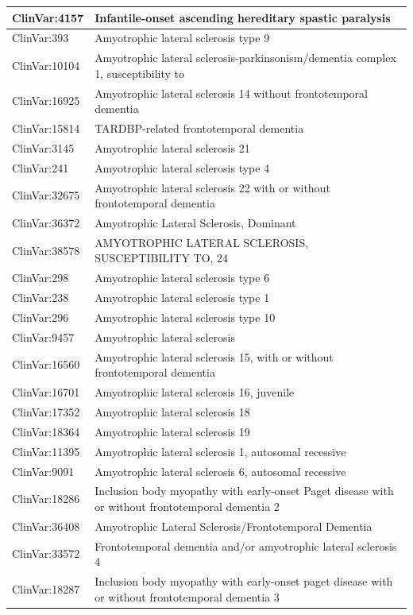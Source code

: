 \documentclass[9pt,a4paper,]{extarticle}
\begin{document}
\begin{table}
\begin{tabular}[t]{l|l}
\hline
ClinVar:4157 & Infantile-onset ascending hereditary spastic paralysis\\
\hline
ClinVar:393 & Amyotrophic lateral sclerosis type 9\\
\hline
ClinVar:10104 & Amyotrophic lateral sclerosis-parkinsonism/dementia complex 1, susceptibility to\\
\hline
ClinVar:16925 & Amyotrophic lateral sclerosis 14 without frontotemporal dementia\\
\hline
ClinVar:15814 & TARDBP-related frontotemporal dementia\\
\hline
ClinVar:3145 & Amyotrophic lateral sclerosis 21\\
\hline
ClinVar:241 & Amyotrophic lateral sclerosis type 4\\
\hline
ClinVar:32675 & Amyotrophic lateral sclerosis 22 with or without frontotemporal dementia\\
\hline
ClinVar:36372 & Amyotrophic Lateral Sclerosis, Dominant\\
\hline
ClinVar:38578 & AMYOTROPHIC LATERAL SCLEROSIS, SUSCEPTIBILITY TO, 24\\
\hline
ClinVar:298 & Amyotrophic lateral sclerosis type 6\\
\hline
ClinVar:238 & Amyotrophic lateral sclerosis type 1\\
\hline
ClinVar:296 & Amyotrophic lateral sclerosis type 10\\
\hline
ClinVar:9457 & Amyotrophic lateral sclerosis\\
\hline
ClinVar:16560 & Amyotrophic lateral sclerosis 15, with or without frontotemporal dementia\\
\hline
ClinVar:16701 & Amyotrophic lateral sclerosis 16, juvenile\\
\hline
ClinVar:17352 & Amyotrophic lateral sclerosis 18\\
\hline
ClinVar:18364 & Amyotrophic lateral sclerosis 19\\
\hline
ClinVar:11395 & Amyotrophic lateral sclerosis 1, autosomal recessive\\
\hline
ClinVar:9091 & Amyotrophic lateral sclerosis 6, autosomal recessive\\
\hline
ClinVar:18286 & Inclusion body myopathy with early-onset Paget disease with or without frontotemporal dementia 2\\
\hline
ClinVar:36408 & Amyotrophic Lateral Sclerosis/Frontotemporal Dementia\\
\hline
ClinVar:33572 & Frontotemporal dementia and/or amyotrophic lateral sclerosis 4\\
\hline
ClinVar:18287 & Inclusion body myopathy with early-onset paget disease with or without frontotemporal dementia 3\\
\hline
\end{tabular}
\end{table}
\end{document}
